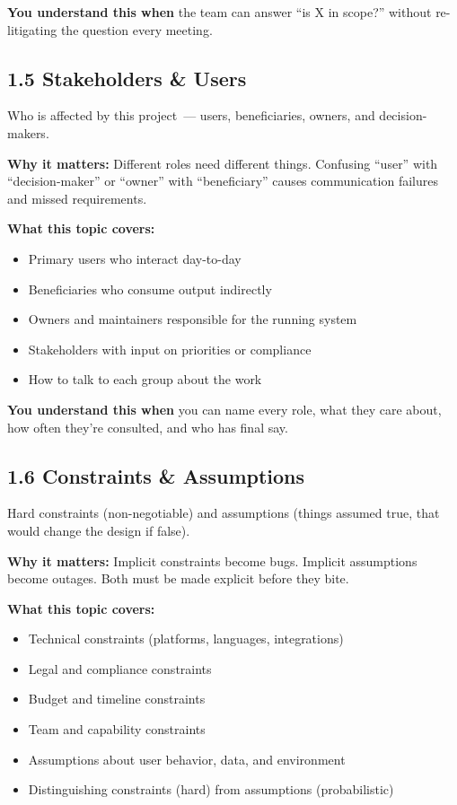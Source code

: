 \noindent{}\textbf{You understand this when} the team can answer ``is X in scope?'' without re-litigating the question every meeting.

\subsection*{1.5 Stakeholders \& Users}\label{project-planning-guide:15-stakeholders--users}

Who is affected by this project~--- users, beneficiaries, owners, and decision-makers.

\textbf{Why it matters:} Different roles need different things. Confusing ``user'' with ``decision-maker'' or ``owner'' with ``beneficiary'' causes communication failures and missed requirements.

\textbf{What this topic covers:}

\begin{itemize}
\tightlist
\item
  Primary users who interact day-to-day
\item
  Beneficiaries who consume output indirectly
\item
  Owners and maintainers responsible for the running system
\item
  Stakeholders with input on priorities or compliance
\item
  How to talk to each group about the work
\end{itemize}

\noindent{}\textbf{You understand this when} you can name every role, what they care about, how often they're consulted, and who has final say.

\subsection*{1.6 Constraints \& Assumptions}\label{project-planning-guide:16-constraints--assumptions}

Hard constraints (non-negotiable) and assumptions (things assumed true, that would change the design if false).

\textbf{Why it matters:} Implicit constraints become bugs. Implicit assumptions become outages. Both must be made explicit before they bite.

\textbf{What this topic covers:}

\begin{itemize}
\tightlist
\item
  Technical constraints (platforms, languages, integrations)
\item
  Legal and compliance constraints
\item
  Budget and timeline constraints
\item
  Team and capability constraints
\item
  Assumptions about user behavior, data, and environment
\item
  Distinguishing constraints (hard) from assumptions (probabilistic)
\end{itemize}

